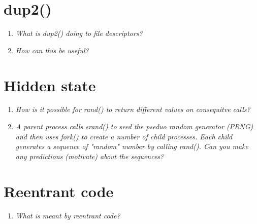 \documentclass[a4paper]{article}
\begin{document}
\section{dup2()}
\begin{enumerate}
  \item \textit{What is dup2() doing to file descriptors?}
  \item \textit{How can this be useful?}
\end{enumerate}

\section{Hidden state}
\begin{enumerate}
  \item \textit{ How is it possible for rand() to return different values on consequitve calls?}
  \item \textit{A parent process calls srand() to seed the pseduo random generator (PRNG) and then uses fork() to create a number of child processes. Each child generates a sequence of "random" number by calling rand(). Can you make any predictions (motivate) about the sequences?}
  
\end{enumerate}

\section{Reentrant code}
\begin{enumerate}
\item \textit{What is meant by reentrant code?}
\end{enumerate}
\end{document}
